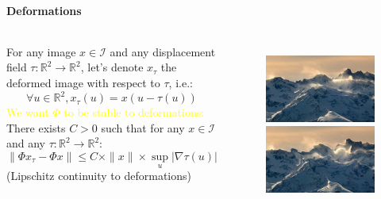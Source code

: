 \documentclass[10pt]{beamer}
\newcommand{\mathR}{\mathbb{R}}
\newcommand{\MI}{{\mathcal I}}
\newcommand{\col}{\textcolor{yellow}}
\begin{document}
\begin{darkframes}
    
    \begin{frame}[label=defor]{\subsecname}
    \framesubtitle{Deformations}
    \begin{columns}
            For any image $x \in \MI$ and any displacement field $\tau : \mathR^2 \rightarrow \mathR^2$, let's denote $x_{\tau}$ the deformed image with respect to $\tau$, i.e.:
            $$\forall u \in \mathR^2, x_{\tau}(u) = x(u-\tau(u))$$
            \col{We want $\Phi$ to be stable to deformations:} There exists $C > 0$ such that for any $x \in \MI$ and any $\tau: \mathR^2 \rightarrow \mathR^2$:
            $$\|\Phi x_{\tau} - \Phi x\| \leq C \times \|x\| \times \sup \limits_u |\nabla \tau(u)|$$
            (Lipschitz continuity to deformations)
            \begin{figure}
            \centering
            \includegraphics[height=0.3\textheight]{resources/25639-9_1.jpg}
            \vspace{0.01\textheight}
            \includegraphics[height=0.3\textheight]{resources/25639-9_5.jpg}
            \end{figure}
    \end{columns}
    \end{frame}
    

\end{darkframes}
\end{document}
